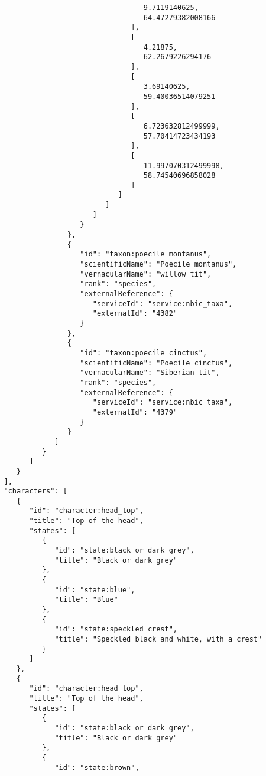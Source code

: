 \documentclass[10pt,letterpaper]{article}
\begin{document}
\begin{verbatim}
                                    9.7119140625,
                                    64.47279382008166
                                 ],
                                 [
                                    4.21875,
                                    62.2679226294176
                                 ],
                                 [
                                    3.69140625,
                                    59.40036514079251
                                 ],
                                 [
                                    6.723632812499999,
                                    57.70414723434193
                                 ],
                                 [
                                    11.997070312499998,
                                    58.74540696858028
                                 ]
                              ]
                           ]
                        ]
                     }
                  },
                  {
                     "id": "taxon:poecile_montanus",
                     "scientificName": "Poecile montanus",
                     "vernacularName": "willow tit",
                     "rank": "species",
                     "externalReference": {
                        "serviceId": "service:nbic_taxa",
                        "externalId": "4382"
                     }
                  },
                  {
                     "id": "taxon:poecile_cinctus",
                     "scientificName": "Poecile cinctus",
                     "vernacularName": "Siberian tit",
                     "rank": "species",
                     "externalReference": {
                        "serviceId": "service:nbic_taxa",
                        "externalId": "4379"
                     }
                  }
               ]
            }
         ]
      }
   ],
   "characters": [
      {
         "id": "character:head_top",
         "title": "Top of the head",
         "states": [
            {
               "id": "state:black_or_dark_grey",
               "title": "Black or dark grey"
            },
            {
               "id": "state:blue",
               "title": "Blue"
            },
            {
               "id": "state:speckled_crest",
               "title": "Speckled black and white, with a crest"
            }
         ]
      },
      {
         "id": "character:head_top",
         "title": "Top of the head",
         "states": [
            {
               "id": "state:black_or_dark_grey",
               "title": "Black or dark grey"
            },
            {
               "id": "state:brown",

\end{verbatim}
\end{document}
